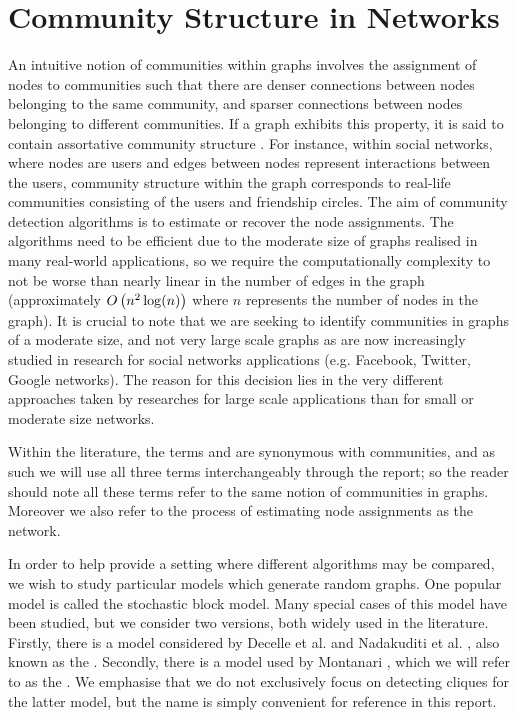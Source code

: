 
\section{Community Structure in Networks}
\label{sec:communityStructureBackground}

An intuitive notion of communities within graphs involves the assignment of nodes to communities such that there are denser connections between nodes belonging to the same community, and sparser connections between nodes belonging to different communities.
If a graph exhibits this property, it is said to contain assortative community structure \cite{New06a,DKM+13,For10,New06b}.
For instance, within social networks, where nodes are users and edges between nodes represent interactions between the users, community structure within the graph corresponds to real-life communities consisting of the users and friendship circles.
The aim of community detection algorithms is to estimate or recover the node assignments.
The algorithms need to be efficient due to the moderate size of graphs realised in many real-world applications, so we require the computationally complexity to not be worse than nearly linear in the number of edges in the graph (approximately $O\left(n^{2}\log(n)\right)$ where $n$ represents the number of nodes in the graph).
It is crucial to note that we are seeking to identify communities in graphs of a moderate size, and not very large scale graphs as are now increasingly studied in research for social networks applications (e.g. Facebook, Twitter, Google networks).
The reason for this decision lies in the very different approaches taken by researches for large scale applications than for small or moderate size networks.

Within the literature, the terms  and  are synonymous with communities, and as such we will use all three terms interchangeably through the report; so the reader should note all these terms refer to the same notion of communities in graphs.
Moreover we also refer to the process of estimating node assignments as  the network.

In order to help provide a setting where different algorithms may be compared, we wish to study particular models which generate random graphs.
One popular model is called the stochastic block model.
Many special cases of this model have been studied, but we consider two versions, both widely used in the literature.
Firstly, there is a model considered by Decelle et al. \cite{DKM+13} and Nadakuditi et al. \cite{NN12}, also known as the .
Secondly, there is a model used by Montanari \cite{DM13,Mon13}, which we will refer to as the . 
We emphasise that we do not exclusively focus on detecting cliques for the latter model, but the name is simply convenient for reference in this report.

